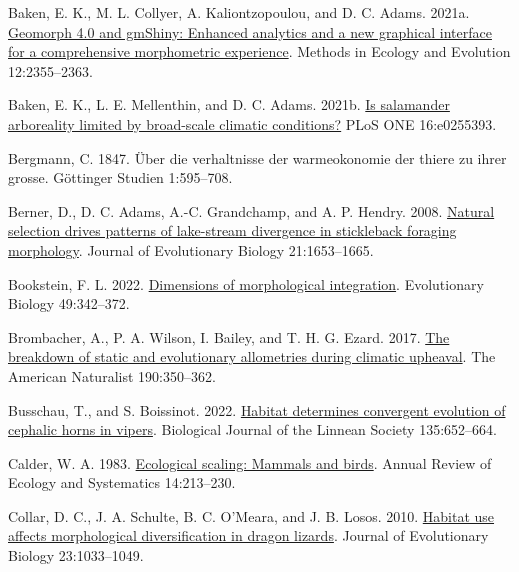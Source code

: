 \documentclass[
  11pt,
]{article}
\newlength{\cslhangindent}
\newlength{\cslentryspacingunit} %
\newenvironment{CSLReferences}[2] %
 {%
  \setlength{\parindent}{0pt}
  \ifodd #1
  \let\oldpar\par
  \def\par{\hangindent=\cslhangindent\oldpar}
  \fi
  \setlength{\parskip}{#2\cslentryspacingunit}
 }%
 {}
\begin{document}
\begin{CSLReferences}{1}{0}
\leavevmode{}%
Baken, E. K., M. L. Collyer, A. Kaliontzopoulou, and D. C. Adams. 2021a.
\href{https://doi.org/10.1111/2041-210X.13723}{Geomorph 4.0 and gmShiny:
Enhanced analytics and a new graphical interface for a comprehensive
morphometric experience}. Methods in Ecology and Evolution
12:2355--2363.

\leavevmode{}%
Baken, E. K., L. E. Mellenthin, and D. C. Adams. 2021b.
\href{https://doi.org/10.1371/journal.pone.0255393}{Is salamander
arboreality limited by broad-scale climatic conditions?} PLoS ONE
16:e0255393.

\leavevmode{}%
Bergmann, C. 1847. {Ü}ber die verhaltnisse der warmeokonomie der thiere
zu ihrer grosse. G{ö}ttinger Studien 1:595--708.

\leavevmode{}%
Berner, D., D. C. Adams, A.-C. Grandchamp, and A. P. Hendry. 2008.
\href{https://doi.org/10.1111/j.1420-9101.2008.01583.x}{Natural
selection drives patterns of lake-stream divergence in stickleback
foraging morphology}. Journal of Evolutionary Biology 21:1653--1665.

\leavevmode{}%
Bookstein, F. L. 2022.
\href{https://doi.org/10.1007/s11692-022-09574-0}{Dimensions of
morphological integration}. Evolutionary Biology 49:342--372.

\leavevmode{}%
Brombacher, A., P. A. Wilson, I. Bailey, and T. H. G. Ezard. 2017.
\href{https://doi.org/10.1086/692570}{The breakdown of static and
evolutionary allometries during climatic upheaval}. The American
Naturalist 190:350--362.

\leavevmode{}%
Busschau, T., and S. Boissinot. 2022.
\href{https://doi.org/10.1093/biolinnean/blac008}{{Habitat determines
convergent evolution of cephalic horns in vipers}}. Biological Journal
of the Linnean Society 135:652--664.

\leavevmode{}%
Calder, W. A. 1983.
\href{https://doi.org/10.1146/annurev.es.14.110183.001241}{Ecological
scaling: Mammals and birds}. Annual Review of Ecology and Systematics
14:213--230.

\leavevmode{}%
Collar, D. C., J. A. Schulte, B. C. O'Meara, and J. B. Losos. 2010.
\href{https://doi.org/10.1111/j.1420-9101.2010.01971.x}{Habitat use
affects morphological diversification in dragon lizards}. Journal of
Evolutionary Biology 23:1033--1049.


\end{CSLReferences}
\end{document}
